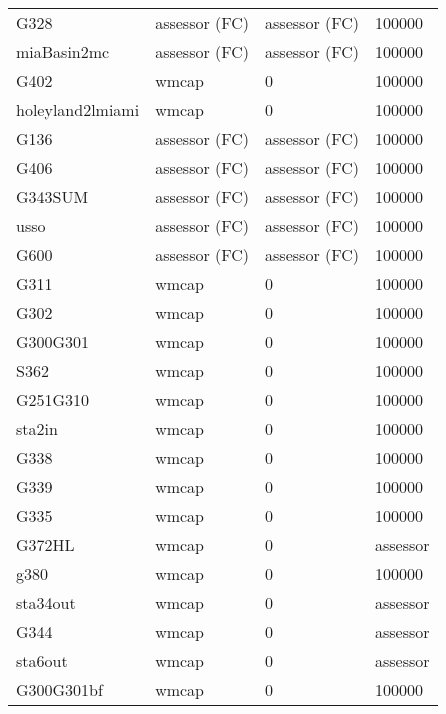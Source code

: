 \begin{table}[!htb]
\begin{center}
\begin{tabular}{p{2.8cm}p{2.0cm}p{2.0cm}p{2.0cm}}
  G328             &assessor (FC)     &assessor (FC)    & 100000   \\
  miaBasin2mc      &assessor (FC)     &assessor (FC)    & 100000   \\
  G402             &wmcap             & 0               & 100000   \\
  holeyland2lmiami &wmcap             & 0               & 100000   \\
  G136             &assessor (FC)     &assessor (FC)    & 100000   \\
  G406             &assessor (FC)     &assessor (FC)    & 100000   \\
  G343SUM          &assessor (FC)     &assessor (FC)    & 100000   \\
  usso             &assessor (FC)     &assessor (FC)    & 100000   \\
  G600             &assessor (FC)     &assessor (FC)    & 100000   \\
  G311             &wmcap             & 0               & 100000   \\
  G302             &wmcap             & 0               & 100000   \\
  G300G301         &wmcap             & 0               & 100000   \\
  S362             &wmcap             & 0               & 100000   \\
  G251G310         &wmcap             & 0               & 100000   \\
  sta2in           &wmcap             & 0               & 100000   \\
  G338             &wmcap             & 0               & 100000   \\
  G339             &wmcap             & 0               & 100000   \\
  G335             &wmcap             & 0               & 100000   \\
  G372HL           &wmcap             & 0               & assessor \\
  g380             &wmcap             & 0               & 100000   \\
  sta34out         &wmcap             & 0               & assessor \\
  G344             &wmcap             & 0               & assessor \\
  sta6out          &wmcap             & 0               & assessor \\
  G300G301bf       &wmcap             & 0               & 100000   \\
  \hline                                                                            
  \end{tabular}
 \end{center}
\end{table}
\normalsize

